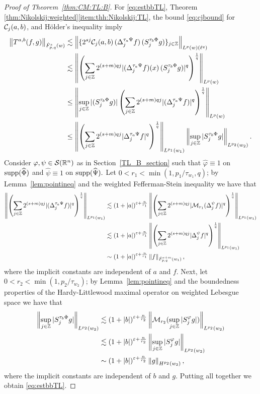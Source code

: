 {\begin{proof}[Proof of Theorem~\ref{thm:CM:TL:B}]
For \eqref{eq:estbbTL},
Theorem \ref{thm:Nikolskij:weighted}\eqref{item:thh:Nikolskij:TL}, the bound \eqref{eq:cjbound} for $\mathcal{C}_j(a,b)$, and H\"older's inequality  imply
\begin{align*}
\left\|T^{a,b}(f,g)\right\|_{\dot{F}^s_{p,q}(w)} & \lesssim \left\|\{2^{sj} \mathcal{C}_j(a,b) \,(\Delta^{ \tau_a \Psi }_{j} f ) \, (S^{ \tau_b \Phi }_{j} g)\}_{j\in\mathbb{Z}} \right\|_{L^p(w)(\ell^q)}\\
& \lesssim \left\|\left(\sum\limits_{j \in \mathbb{Z}}  2^{(s +m) q j}  |(\Delta^{ \tau_a \Psi }_{j} f )(x) \, (S^{ \tau_b \Phi }_{j} g)|^q   \right)^\frac{1}{q}\right\|_{L^p(w)}\\
& \le\left\|\sup\limits_{j \in \mathbb{Z}} |(S^{ \tau_b \Phi }_{j} g)| \left(\sum\limits_{j \in \mathbb{Z}}  2^{(s +m) q j}  |(\Delta^{ \tau_a \Psi }_{j} f )|^q   \right)^\frac{1}{q}\right\|_{L^p(w)}\\
& \le \left\|\left(\sum_{j \in \mathbb{Z}}  2^{(s +m) q j}  |\Delta^{ \tau_a \Psi }_{j} f |^q   \right)^\frac{1}{q}\right\|_{L^{p_1}(w_1)} \left\|\sup\limits_{j \in \mathbb{Z}} |S^{ \tau_b \Phi }_{j} g|\right\|_{L^{p_2}(w_2)}.
\end{align*}
Consider $\varphi,\psi\in{\mathcal{S}}({{\mathbb R}^n})$ as in Section~\ref{TL_B_section} such that   $\widehat{\varphi}\equiv 1$ on ${\rm{supp}}(\widehat{\Phi})$ and  $\widehat{\psi}\equiv 1$ on ${\rm{supp}}(\widehat{\Psi}).$  Let   $0<r_1<\min(1, p_1/\tau_{w_1},q)$; by Lemma~\ref{lem:pointineq} and the weighted Fefferman-Stein inequality  we have that  
\begin{align*}
\left\|\left(\sum_{j \in \mathbb{Z}}  2^{(s +m) q j}  |(\Delta^{ \tau_a \Psi }_{j} f )|^q   \right)^\frac{1}{q}\right\|_{L^{p_1}(w_1)}&\lesssim (1+\left\vert a \right\vert)^{\varepsilon+\frac{n}{r_1}}
\left\|\left(\sum_{j \in \mathbb{Z}}  2^{(s +m) q j}  |\mathcal{M}_{r_1}(\Delta^{\psi }_{j} f) |^q   \right)^\frac{1}{q}\right\|_{L^{p_1}(w_1)}\\
&\lesssim (1+\left\vert a \right\vert)^{\varepsilon+\frac{n}{r_1}} \left\|\left(\sum_{j \in \mathbb{Z}}  2^{(s +m) q j}  |\Delta^{\psi }_{j} f|^q   \right)^\frac{1}{q}\right\|_{L^{p_1}(w_1)}\\
&\sim (1+\left\vert a \right\vert)^{\varepsilon+\frac{n}{r_1}}  \left\|f\right\|_{\dot{F}^{s+m}_{p,q}(w_1)},
\end{align*}
where the implicit constants are independent of $a$ and $f.$ Next, let  $0<r_2<\min(1,p_2/\tau_{w_2})$; by Lemma~\ref{lem:pointineq} and the boundedness properties of the Hardy-Littlewood maximal operator on weighted Lebesgue space  we have that  
\begin{align*}
\left\|\sup_{j\in\mathbb{Z}}|S^{\tau_b\Phi}_{j}g|\right\|_{L^{p_2}(w_2)}&\lesssim (1+\left\vert b \right\vert)^{\varepsilon+\frac{n}{r_2}} \left\|\mathcal{M}_{r_2}(\sup_{j\in\mathbb{Z}}|S^{\varphi}_{j}g|)\right\|_{L^{p_2}(w_2)}\\
&\lesssim (1+\left\vert b \right\vert)^{\varepsilon+\frac{n}{r_2}} \left\|\sup_{j\in\mathbb{Z}}|S^{\varphi}_{j}g|\right\|_{L^{p_2}(w_2)}\\
&\sim (1+\left\vert b \right\vert)^{\varepsilon+\frac{n}{r_2}} \left\|g\right\|_{H^{p_2}(w_2)},
\end{align*}
where the implicit constants are independent of $b$ and $g.$ Putting all together we obtain \eqref{eq:estbbTL}.



\end{proof}}
